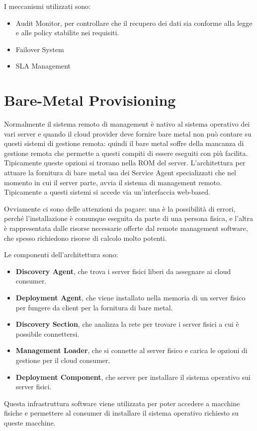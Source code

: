 I meccanismi utilizzati sono:
\begin{itemize}
    \item Audit Monitor, per controllare che il recupero dei dati sia conforme alla legge e alle policy stabilite nei requisiti.
    \item Failover System
    \item SLA Management
\end{itemize}

\section{Bare-Metal Provisioning}
Normalmente il sistema remoto di management è nativo al sistema operativo dei vari server e quando il cloud provider deve fornire bare metal non può contare su questi sistemi di gestione remota: quindi il bare metal soffre della mancanza di gestione remota che permette a questi compiti di essere eseguiti con più facilita. Tipicamente queste opzioni si trovano nella ROM del server. L'architettura per attuare la fornitura di bare metal usa dei Service Agent specializzati che nel momento in cui il server parte, avvia il sistema di management remoto. Tipicamente a questi sistemi si accede via un'interfaccia web-based. 

Ovviamente ci sono delle attenzioni da pagare: una è la possibilità di errori, perché l'installazione è comunque eseguita da parte di una persona fisica, e l'altra è rappresentata dalle risorse necessarie offerte dal remote management software, che spesso richiedono risorse di calcolo molto potenti.

\vspace{5mm}

Le componenti dell'architettura sono:
\begin{itemize}
    \item \textbf{Discovery Agent}, che trova i server fisici liberi da assegnare ai cloud consumer.
    \item \textbf{Deployment Agent}, che viene installato nella memoria di un server fisico per fungere da client per la fornitura di bare metal.
    \item \textbf{Discovery Section}, che analizza la rete per trovare i server fisici a cui è possibile connettersi.
    \item \textbf{Management Loader}, che si connette al server fisico e carica le opzioni di gestione per il cloud consumer.
    \item \textbf{Deployment Component}, che server per installare il sistema operativo sui server fisici.
\end{itemize}
Questa infrastruttura software viene utilizzata per poter accedere a macchine fisiche e permettere al consumer di installare il sistema operativo richiesto su queste macchine.

